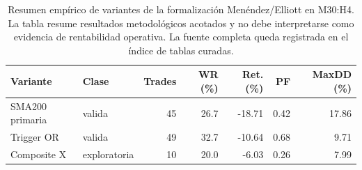 \begin{table}[H]
\centering
\scriptsize
\begin{tabular}{llrrrrr}
\hline
Variante & Clase & Trades & WR (\%) & Ret. (\%) & PF & MaxDD (\%) \\
\hline
SMA200 primaria & valida & 45 & 26.7 & -18.71 & 0.42 & 17.86 \\
Trigger OR & valida & 49 & 32.7 & -10.64 & 0.68 & 9.71 \\
Composite X & exploratoria & 10 & 20.0 & -6.03 & 0.26 & 7.99 \\
\hline
\end{tabular}
\caption{Resumen emp\'irico de variantes de la formalizaci\'on Men\'endez/Elliott en M30:H4. La tabla resume resultados metodol\'ogicos acotados y no debe interpretarse como evidencia de rentabilidad operativa. La fuente completa queda registrada en el \'indice de tablas curadas.}
\label{tab:menendez-variantes}
\end{table}
